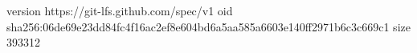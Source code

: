 version https://git-lfs.github.com/spec/v1
oid sha256:06de69e23dd84fc4f16ac2ef8e604bd6a5aa585a6603e140ff2971b6c3c669c1
size 393312
